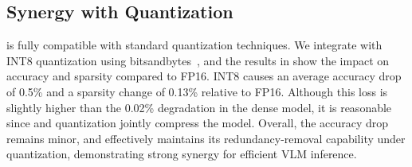 {\subsection{Synergy with Quantization}
{\proj is fully compatible with standard quantization techniques. We integrate \proj{} with INT8 quantization using bitsandbytes~\cite{dettmers20218}, and the results in  show the impact on accuracy and sparsity compared to FP16. INT8 causes an average accuracy drop of 0.5\% and a sparsity change of 0.13\% relative to FP16. Although this loss is slightly higher than the 0.02\% degradation in the dense model, it is reasonable since \proj and quantization jointly compress the model. Overall, the accuracy drop remains minor, and \proj effectively maintains its redundancy-removal capability under quantization, demonstrating strong synergy for efficient VLM inference.}

\begin{table}[t]
    \centering
    \caption{{Influence of INT8 quantization on accuracy and sparsity}}
\end{table}



}
